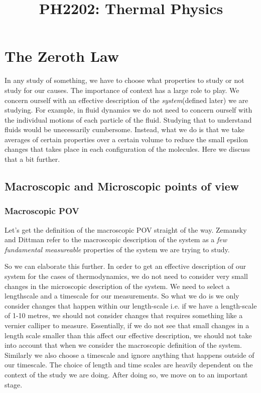 \documentclass[a4paper]{article}
\title{PH2202: Thermal Physics}
\begin{document}
    
    \newpage
    \tableofcontents
    \newpage 
    
   \section{The Zeroth Law}
   In any study of something, we have to choose what properties to study or not 
   study for our causes. The importance of context has a large role to play. We concern ourself 
   with an effective description of the \emph{system}(defined later) we are studying. 
   For example, in fluid dynamics we do not need to concern ourself with the individual motions 
   of each particle of the fluid. Studying that to understand fluids would be unecessarily cumbersome.
   Instead, what we do is that we take averages of certain properties over a certain volume to 
   reduce the small epsilon changes that takes place in each configuration of the molecules. 
   Here we discuss that a bit further.

   \subsection{Macroscopic and Microscopic points of view}
   \subsubsection{Macroscopic POV}
   Let's get the definition of the macroscopic POV straight of the way. Zemansky and Dittman refer
   to the macroscopic description of the system as a \emph{few fundamental measureable} properties of 
   the system we are trying to study.   

   So we can elaborate this further. In order to get an effective description of our system for the 
   cases of thermodynamics,
   we do not need to consider very small changes in the microscopic description of the system. 
   We need to select a lengthscale and a timescale for our measurements. So what we do is we only 
   consider changes that happen within our length-scale i.e. if we have a length-scale of 1-10 
   metres, we should not consider changes that requires something like a vernier calliper to 
   measure. Essentially, if we do not see that small changes in a length scale smaller than this
    affect our effective description, we should not take into account that when we consider the 
   macroscopic definition of the system. Similarly we also choose a timescale and ignore anything 
   that happens outside of our timescale. The choice of length and time scales are heavily dependent 
   on the context of the study we are doing. After doing so, we move on to an important stage.
\end{document}
